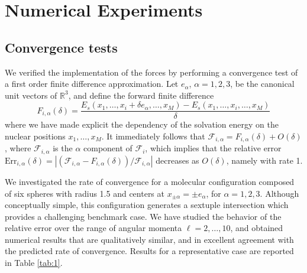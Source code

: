 \documentclass[aip,jcp,a4paper,11pt]{revtex4-1}
\begin{document}
\section{Numerical Experiments}\label{sec:experiments}
\subsection{Convergence tests}
We verified the implementation of the forces by performing a convergence test of a first order finite difference approximation. Let $e_\alpha$, $\alpha=1,2,3$, be the canonical unit vectors of $\mathbb R^3$, and define the forward finite difference
\[
	F_{i,\alpha}(\delta)
	= 
	\frac{E_s(x_1,\ldots,x_i + \delta e_\alpha,\ldots,x_M) - E_s(x_1,\ldots,x_i,\ldots,x_M)}{\delta}
\]
where we have made explicit the dependency of the solvation energy on the nuclear positions $x_1 , \ldots , x_M$. It immediately follows that $\mathcal{F}_{i,\alpha} = F_{i,\alpha}(\delta) + O(\delta)$, where $\mathcal{F}_{i,\alpha}$ is the $\alpha$ component of $\mathcal{F}_i$, which implies that the relative error $\text{Err}_{i,\alpha}(\delta) = |(\mathcal{F}_{i,\alpha} - F_{i,\alpha}(\delta))/\mathcal{F}_{i,\alpha}|$ decreases as $O(\delta)$, namely with rate 1.

We investigated the rate of convergence for a molecular configuration composed of six spheres with radius 1.5 and centers at $x_{\pm \alpha} = \pm e_\alpha$, for $\alpha = 1, 2,3$. Although conceptually simple, this configuration generates a sextuple intersection which provides a challenging benchmark case. We have studied the behavior of the relative error over the range of angular momenta $\ell = 2, \ldots , 10$, and obtained numerical results that are qualitatively similar, and in excellent agreement with the predicted rate of convergence. Results for a representative case are reported in Table \ref{tab:1}.

\end{document}
